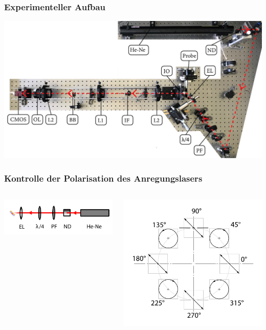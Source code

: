 \documentclass[aspectratio=1610]{beamer}
\begin{document}
	\begin{frame}
		\frametitle{Experimenteller Aufbau}
	\begin{center}
		\includegraphics[width=\textwidth]{figures/aufsicht_aufbau_anotated.jpg}
	\end{center}
		
	\end{frame}
	\begin{frame}
	\frametitle{Kontrolle der Polarisation des Anregungslasers}
		\begin{columns}
			\begin{column}{0.5\textwidth}
				\includegraphics[width=\textwidth]{figures/polarisation_sheme.pdf}
			\end{column}
			\begin{column}{0.5\textwidth}  %
				\includegraphics[width=\textwidth]{figures/Polarisation_lambda.pdf}
			\end{column}
		\end{columns}	
	\end{frame}
\end{document}
